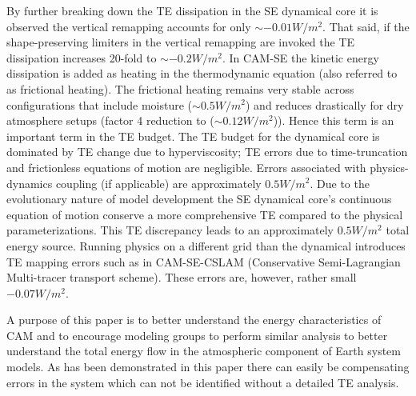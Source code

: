 \documentclass[draft,linenumbers]{agujournal}
\begin{document}
By further breaking down the TE dissipation in the SE dynamical core it is observed the vertical remapping accounts for only $\sim-0.01W/m^2$. That said, if the shape-preserving limiters in the vertical remapping are invoked the TE dissipation increases 20-fold to $\sim-0.2W/m^2$. In CAM-SE the kinetic energy dissipation is added as heating in the thermodynamic equation (also referred to as frictional heating). The frictional heating remains very stable across configurations that include moisture ($\sim 0.5W/m^2$) and reduces drastically for dry atmosphere setups (factor 4 reduction to ($\sim 0.12W/m^2$)). Hence this term is an important term in the TE budget. The TE budget for the dynamical core is dominated by TE change due to hyperviscosity; TE errors due to time-truncation and frictionless equations of motion are negligible. Errors associated with physics-dynamics coupling (if applicable) are approximately $0.5W/m^2$. Due to the evolutionary nature of model development the SE dynamical core's continuous equation of motion conserve a more comprehensive TE compared to the physical parameterizations. This TE discrepancy leads to an approximately $0.5W/m^2$ total energy source. Running physics on a different grid than the dynamical introduces TE mapping errors such as in CAM-SE-CSLAM (Conservative Semi-Lagrangian Multi-tracer transport scheme). These errors are, however, rather small $-0.07W/m^2$.

A purpose of this paper is to better understand the energy characteristics of CAM and to encourage modeling groups to perform similar analysis to better understand the total energy flow in the atmospheric component of Earth system models. As has been demonstrated in this paper there can easily be compensating errors in the system which can not be identified without a detailed TE analysis.


\end{document}
